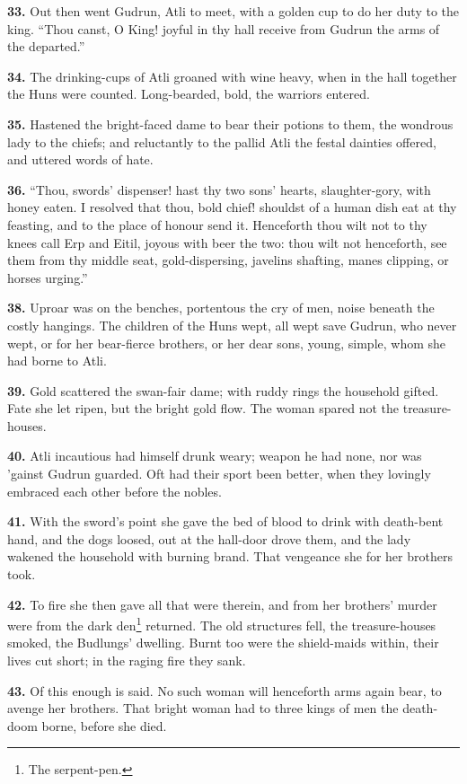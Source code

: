 \textbf{33.} Out then went Gudrun, Atli to meet, with a golden cup to do her
duty to the king. ``Thou canst, O King! joyful in thy hall receive
from Gudrun the arms of the departed.''

\textbf{34.} The drinking-cups of Atli groaned with wine heavy, when in the
hall together the Huns were counted. Long-bearded, bold, the warriors
entered.

\textbf{35.} Hastened the bright-faced dame to bear their potions to them,
the wondrous lady to the chiefs; and reluctantly to the pallid Atli
the festal dainties offered, and uttered words of hate.

\textbf{36.} ``Thou, swords' dispenser! hast thy two sons' hearts,
slaughter-gory, with honey eaten. I resolved that thou, bold chief!
shouldst of a human dish eat at thy feasting, and to the place of
honour send it. Henceforth thou wilt not to thy knees call Erp and
Eitil, joyous with beer the two: thou wilt not henceforth, see them
from thy middle seat, gold-dispersing, javelins shafting, manes
clipping, or horses urging.''

\textbf{38.} Uproar was on the benches, portentous the cry of men, noise
beneath the costly hangings. The children of the Huns wept, all wept
save Gudrun, who never wept, or for her bear-fierce brothers, or her
dear sons, young, simple, whom she had borne to Atli.

\textbf{39.} Gold scattered the swan-fair dame; with ruddy rings the
household gifted. Fate she let ripen, but the bright gold flow. The
woman spared not the treasure-houses.

\textbf{40.} Atli incautious had himself drunk weary; weapon he had none, nor
was 'gainst Gudrun guarded. Oft had their sport been better, when they
lovingly embraced each other before the nobles.

\textbf{41.} With the sword's point she gave the bed of blood to drink with
death-bent hand, and the dogs loosed, out at the hall-door drove them,
and the lady wakened the household with burning brand. That vengeance
she for her brothers took.

\textbf{42.} To fire she then gave all that were therein, and from her
brothers' murder were from the dark den\footnote{The serpent-pen.} returned. The old
structures fell, the treasure-houses smoked, the Budlungs' dwelling.
Burnt too were the shield-maids within, their lives cut short; in the
raging fire they sank.

\textbf{43.} Of this enough is said. No such woman will henceforth arms again
bear, to avenge her brothers. That bright woman had to three kings of
men the death-doom borne, before she died.

